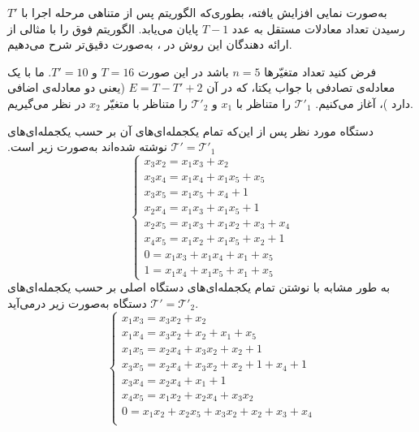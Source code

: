 $T'$
به‌صورت نمایی افزایش یافته، بطوری‌که الگوریتم پس از متناهی مرحله اجرا با رسیدن تعداد معادلات مستقل به عدد 
$T - 1$
پایان می‌یابد. 
الگوریتم فوق را با مثالی از ارائه دهندگان این روش در 
\cite{courtois2002cryptanalysis}،
به‌صورت دقیق‌تر شرح می‌دهیم. 
  \begin{example}[\lr{$T'$-Methode}]
  	فرض کنید تعداد متغیّر‌ها 
  	$n = 5$
  	باشد در این صورت 
  	$T = 16$
  	و 
  	$T' = 10$.
  	ما با یک معادله‌ی تصادفی با جواب یکتا، که در آن 
  	$E =  T-T' + 2$
  	 (یعنی  دو معادله‌ی اضافی دارد )، آغاز می‌کنیم. 
  	$\mathcal{T}'_{1}$
  	را متناظر با 
  	$x_{1}$
  	و 
  	$\mathcal{T}'_{2}$
  	را متناظر با متغیّر 
  	$x_{2}$
  	در نظر می‌گیریم. 
  	
  	دستگاه مورد نظر پس از این‌که تمام یکجمله‌ای‌های آن بر حسب یکجمله‌ای‌های 
  	$\mathcal{T}' = \mathcal{T}'_{1}$
نوشته شده‌اند به‌صورت زیر است. 
  {\footnotesize 	\begin{equation}
  	\label{eqsys1}
  	\left \{ \begin{array}{l}
  	x_3 x_2 = x_1 x_3 + x_2\\
  	x_3 x_4 = x_1 x_4 + x_1 x_5 + x_5\\
  	x_3 x_5 = x_1 x_5 + x_4 + 1\\
  	x_2 x_4 = x_1 x_3 + x_1 x_5 + 1\\
  	x_2 x_5 = x_1 x_3 + x_1 x_2 + x_3 + x_4\\
  	x_4 x_5 = x_1 x_2 + x_1 x_5 + x_2 + 1\\
  	0 = x_1 x_3 + x_1 x_4 + x_1 + x_5\\
  	1 = x_1 x_4 + x_1 x_5 + x_1 + x_5
  	\end{array} \right.
  	\end{equation}}
  	به طور مشابه با نوشتن تمام یکجمله‌ای‌های دستگاه اصلی بر حسب یکجمله‌ای‌های 
  	$\mathcal{T}' = \mathcal{T}'_{2}$
  	دستگاه به‌صورت زیر درمی‌آید.  
  {\footnotesize 	\begin{equation}
  	\label{eqsys2}
  	\left \{ \begin{array}{l}
  	x_1 x_3 = x_3 x_2 + x_2\\
  	x_1 x_4 = x_3 x_2 + x_2 + x_1 + x_5\\
  	x_1 x_5 = x_2 x_4 + x_3 x_2 + x_2 + 1\\
  	x_3 x_5 = x_2 x_4 + x_3 x_2 + x_2 + 1 + x_4 + 1\\
  	x_3 x_4 = x_2 x_4 + x_1 + 1\\
  	x_4 x_5 = x_1 x_2 + x_2 x_4 + x_3 x_2\\
  	0 = x_1 x_2 + x_2 x_5 + x_3 x_2 + x_2 + x_3 + x_4\\

\end{array}
\end{equation}}
\end{example}

